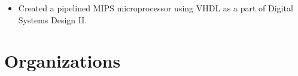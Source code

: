 \documentclass[]{deedy-resume-openfont}
\begin{document}
\begin{minipage}[t]{0.66\textwidth}
\sectionsep


\sectionsep


\begin{itemize}
    \setlength\itemsep{0pt}
    \item Created a pipelined MIPS microprocessor using VHDL as a part of Digital Systems Design II.
\end{itemize}




\section{Organizations}


\end{minipage}
\end{document}
